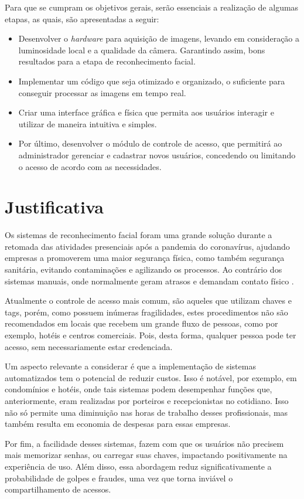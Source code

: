 Para que se cumpram os objetivos gerais, serão essenciais a realização de algumas etapas, 
as quais, são apresentadas a seguir:

\begin{itemize}
    \item  Desenvolver o \textit{hardware} para aquisição de imagens, levando em 
    consideração a luminosidade local e a qualidade da câmera. Garantindo assim, 
    bons resultados para a etapa de reconhecimento facial.
  
    \item Implementar um código que seja otimizado e organizado, o suficiente para 
    conseguir processar as imagens em tempo real. 
    
    \item Criar uma interface gráfica e física que permita aos usuários interagir 
    e utilizar de maneira intuitiva e simples.
    
    \item Por último, desenvolver o módulo de controle de acesso, que permitirá 
    ao administrador gerenciar e cadastrar novos usuários, concedendo ou 
    limitando o acesso de acordo com as necessidades.
\end{itemize}

\section{Justificativa}\label{sec:justificativa}

Os sistemas de reconhecimento facial foram uma grande solução durante a retomada 
das atividades presenciais após a pandemia do coronavírus, ajudando empresas
a promoverem uma maior segurança física, como também segurança sanitária, 
evitando contaminações e agilizando os processos. Ao contrário dos sistemas 
manuais, onde normalmente geram atrasos e demandam contato físico \cite{terra2020}.

Atualmente o controle de acesso mais comum, são aqueles que utilizam chaves 
e tags, porém, como possuem inúmeras fragilidades, estes procedimentos não são 
recomendados em locais que recebem um grande fluxo de pessoas, como por exemplo, 
hotéis e centros comerciais. Pois, desta forma, qualquer pessoa pode ter acesso, 
sem necessariamente estar credenciada.

Um aspecto relevante a considerar é que a implementação de sistemas 
automatizados tem o potencial de reduzir custos. Isso é notável, por 
exemplo, em condomínios e hotéis, onde tais sistemas podem desempenhar 
funções que, anteriormente, eram realizadas por porteiros e recepcionistas 
no cotidiano. Isso não só permite uma diminuição nas horas de trabalho 
desses profissionais, mas também resulta em economia de despesas para 
essas empresas.

Por fim, a facilidade desses sistemas, fazem com que os usuários não precisem 
mais memorizar senhas, ou carregar suas chaves, impactando positivamente na 
experiência de uso. Além disso, essa abordagem reduz significativamente a 
probabilidade de golpes e fraudes, uma vez que torna inviável o 
compartilhamento de acessos.
